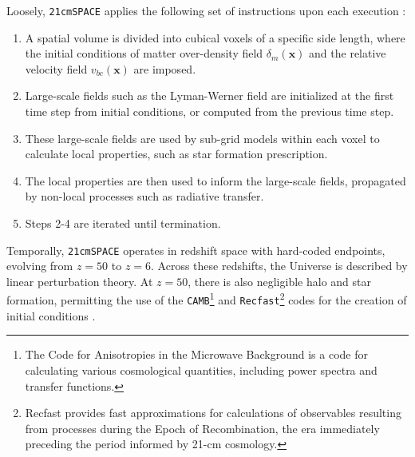 \documentclass[floats,floatfix,showpacs,amssymb,prd,superscriptaddress,nofootinbib]{revtex4-2} %
\newcommand{\code}{\texttt}
\begin{document}
Loosely, \code{21cmSPACE} applies the following set of instructions upon each execution \citep{gessey-jones_thesis}:

\begin{enumerate}
    \item A spatial volume is divided into cubical voxels of a specific side length, where the initial conditions of matter over-density field $\delta_m(\textbf{x})$ and the relative velocity field $v_{bc}(\textbf{x})$ are imposed.

    \item Large-scale fields such as the Lyman-Werner field are initialized at the first time step from initial conditions, or computed from the previous time step.

    \item These large-scale fields are used by sub-grid models within each voxel to calculate local properties, such as star formation prescription.

    \item The local properties are then used to inform the large-scale fields, propagated by non-local processes such as radiative transfer.

    \item Steps 2-4 are iterated until termination.
\end{enumerate}

Temporally, \code{21cmSPACE} operates in redshift space with hard-coded endpoints, evolving from $z = 50$ to $z = 6$. Across these redshifts, the Universe is described by linear perturbation theory. At $z = 50$, there is also negligible halo and star formation, permitting the use of the \code{CAMB}\footnote{The Code for Anisotropies in the Microwave Background is a code for calculating various cosmological quantities, including power spectra and transfer functions.}\citep{Lewis_Challinor_2011} and \code{Recfast}\footnote{Recfast provides fast approximations for calculations of observables resulting from processes during the Epoch of Recombination, the era immediately preceding the period informed by 21-cm cosmology.}\citep{Seager_2011} codes for the creation of initial conditions \citep{gessey-jones_thesis}.
\end{document}
